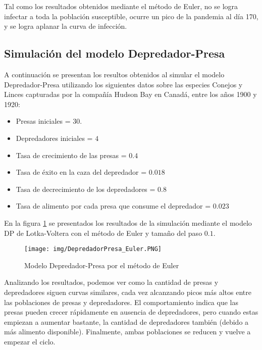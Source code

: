 \documentclass[a4paper,12pt]{article}
\begin{document}
Tal como los resultados obtenidos mediante el método de Euler, no se logra infectar a toda la población susceptible, ocurre un pico de la pandemia al día 170, y se logra aplanar la curva de infección. \par

\subsection{Simulación del modelo Depredador-Presa}

A continuación se presentan los resultos obtenidos al simular el modelo Depredador-Presa utilizando los siguientes datos sobre las especies Conejos y Linces capturadas por la compañía Hudson Bay en Canadá, entre los años 1900 y 1920:

\begin{itemize}
    \item Presas iniciales = $30$.
    \item Depredadores iniciales = $4$  
    \item Tasa de crecimiento de las presas = $0.4$
    \item Tasa de éxito en la caza del depredador = $0.018$
    \item Tasa de decrecimiento de los depredadores = $0.8$
    \item Tasa de alimento por cada presa que consume el depredador = $0.023$
\end{itemize}

En la figura \ref{fig:dp_euler} se presentados los resultados de la simulación mediante el modelo DP de Lotka-Voltera con el método de Euler y tamaño del paso $0.1$.

\begin{figure}[ht!]
\centering
\texttt{[image: img/DepredadorPresa\_Euler.PNG]}
\vspace{-1em}
\caption{Modelo Depredador-Presa por el método de Euler}
\label{fig:dp_euler}
\end{figure} 
\newpage

Analizando los resultados, podemos ver como la cantidad de presas y depredadores siguen curvas similares, cada vez alcanzando picos más altos entre las poblaciones de presas y depredadores. El comportamiento indica que las presas pueden crecer rápidamente en ausencia de depredadores, pero cuando estas empiezan a aumentar bastante, la cantidad de depredadores también (debido a más alimento disponible). Finalmente, ambas poblaciones se reducen y vuelve a empezar el ciclo.
\end{document}
